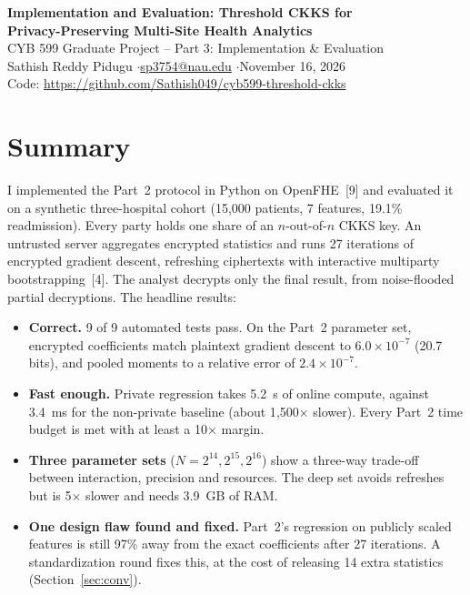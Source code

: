 \documentclass[11pt]{article}
\newcommand{\repo}{\url{https://github.com/Sathish049/cyb599-threshold-ckks}}
\begin{document}
\sloppy

\begin{center}
{\Large\bfseries Implementation and Evaluation: Threshold CKKS for\\[2pt] Privacy-Preserving Multi-Site Health Analytics}\\[7pt]
CYB 599 Graduate Project -- Part 3: Implementation \& Evaluation\\[3pt]
Sathish Reddy Pidugu \quad$\cdot$\quad \href{mailto:sp3754@nau.edu}{sp3754@nau.edu} \quad$\cdot$\quad November 16, 2026\\[3pt]
Code: \repo
\end{center}

\section{Summary}

I implemented the Part~2 protocol in Python on OpenFHE~[9] and evaluated it on a synthetic three-hospital cohort (15{,}000 patients, 7 features, 19.1\% readmission). Every party holds one share of an $n$-out-of-$n$ CKKS key. An untrusted server aggregates encrypted statistics and runs 27 iterations of encrypted gradient descent, refreshing ciphertexts with interactive multiparty bootstrapping~[4]. The analyst decrypts only the final result, from noise-flooded partial decryptions. The headline results:
\begin{itemize}
  \item \textbf{Correct.} 9 of 9 automated tests pass. On the Part~2 parameter set, encrypted coefficients match plaintext gradient descent to $6.0\times10^{-7}$ (20.7 bits), and pooled moments to a relative error of $2.4\times10^{-7}$.
  \item \textbf{Fast enough.} Private regression takes 5.2~s of online compute, against 3.4~ms for the non-private baseline (about 1{,}500$\times$ slower). Every Part~2 time budget is met with at least a 10$\times$ margin.
  \item \textbf{Three parameter sets} ($N=2^{14},2^{15},2^{16}$) show a three-way trade-off between interaction, precision and resources. The deep set avoids refreshes but is 5$\times$ slower and needs 3.9~GB of RAM.
  \item \textbf{One design flaw found and fixed.} Part~2's regression on publicly scaled features is still 97\% away from the exact coefficients after 27 iterations. A standardization round fixes this, at the cost of releasing 14 extra statistics (Section~\ref{sec:conv}).
\end{itemize}
\end{document}
